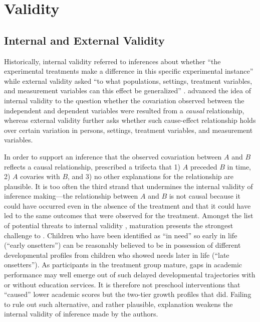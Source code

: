 \section{Validity}

\subsection{Internal and External Validity}

Historically, internal validity referred to inferences about whether ``the experimental treatments make a difference in this specific experimental instance'' while external validity asked ``to what populations, settings, treatment variables, and measurement variables can this effect be generalized'' \parencite[][p. 5]{campbell:1963}. \textcite{cook:1979} advanced the idea of internal validity to the question whether the covariation observed between the independent and dependent variables were resulted from a \emph{causal} relationship, whereas external validity further asks whether such cause-effect relationship holds over certain variation in persons, settings, treatment variables, and measurement variables.

In order to support an inference that the observed covariation between $A$ and $B$ reflects a causal relationship, \textcite{shadish:2002} prescribed a trifecta that 1) $A$ preceded $B$ in time, 2) $A$ covaries with $B$, and 3) no other explanations for the relationship are plausible. It is too often the third strand that undermines the internal validity of inference making---the relationship between $A$ and $B$ is not causal because it could have occurred even in the absence of the treatment and that it could have led to the same outcomes that were observed for the treatment. Amongst the list of potential threats to internal validity \parencite[][pp. 54--61]{shadish:2002}, maturation presents the strongest challenge to \textcite{sullivan:2013}. Children who have been identified as ``in need'' so early in life (``early onsetters'') can be reasonably believed to be in possession of different developmental profiles from children who showed needs later in life (``late onsetters''). As participants in the treatment group mature, gaps in academic performance may well emerge out of such delayed developmental trajectories with or without education services. It is therefore not preschool interventions that ``caused'' lower academic scores but the two-tier growth profiles that did. Failing to rule out such alternative, and rather plausible, explanation weakens the internal validity of inference made by the authors.

